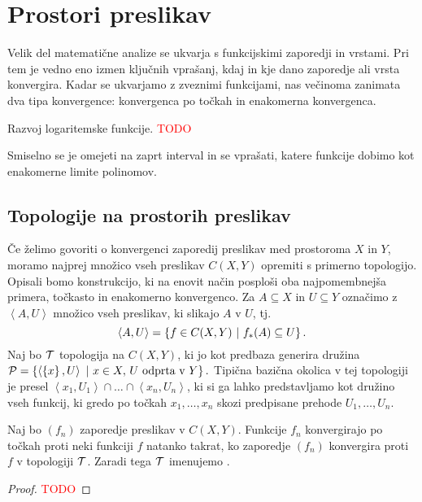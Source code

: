 \section{Prostori preslikav}
Velik del matematične analize se ukvarja s funkcijskimi zaporedji in vrstami. Pri tem je vedno eno izmen ključnih vprašanj, kdaj in kje dano zaporedje ali vrsta konvergira. Kadar se ukvarjamo z zveznimi funkcijami, nas večinoma zanimata dva tipa konvergence: konvergenca po točkah in enakomerna konvergenca.

\begin{primer}
    Razvoj logaritemske funkcije. \textcolor{red}{TODO}

    Smiselno se je omejeti na zaprt interval in se vprašati, katere funkcije dobimo kot enakomerne limite polinomov.
\end{primer}

\subsection{Topologije na prostorih preslikav}
Če želimo govoriti o konvergenci zaporedij preslikav med prostoroma $X$ in $Y$, moramo najprej množico vseh preslikav \(C(X, Y)\) opremiti s primerno topologijo. Opisali bomo konstrukcijo, ki na enovit način posploši oba najpomembnejša primera, točkasto in enakomerno konvergenco. Za \(A \subseteq X\) in \(U \subseteq Y\) označimo z $\left\langle A, U\right\rangle$ množico vseh preslikav, ki slikajo $A$ v $U$, tj. 
$$\left\langle A, U \right\rangle = \left\{f \in C(X,Y) \ | \ f_{*}(A) \subseteq U\right\}.$$
Naj bo $\mathcal{T}$ topologija na $C(X, Y)$, ki jo kot predbaza generira družina \(\mathcal{P} = \left\{\left\langle \left\{x\right\}, U \right\rangle \ | \ x \in X, \, U \text{ odprta v } Y\right\}.\) Tipična bazična okolica v tej topologiji je presel $\left\langle x_1, U_1 \right\rangle \cap \ldots \cap \left\langle x_n, U_n \right\rangle$, ki si ga lahko predstavljamo kot družino vseh funkcij, ki gredo po točkah $x_1, \ldots, x_n$ skozi predpisane prehode $U_1, \ldots, U_n$.

\begin{trditev}
    Naj bo \((f_n)\) zaporedje preslikav v \(C(X, Y)\). Funkcije \(f_n\) konvergirajo po točkah proti neki funkciji $f$ natanko takrat, ko zaporedje \((f_n)\) konvergira proti $f$ v topologiji $\mathcal{T}$. Zaradi tega \(\mathcal{T}\) imenujemo .
\end{trditev}

\begin{proof}
    \textcolor{red}{TODO}
\end{proof}

